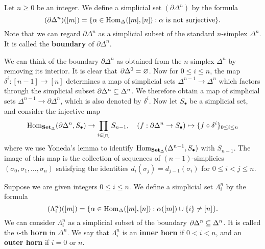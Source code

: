 Let $n\geq 0$ be an integer. We define a simplicial set $(\partial\Delta^n)$ by the formula
\[(\partial\Delta^n)([m])=\{\alpha\in\mathrm{Hom}_{\Delta}([m],[n]):\text{$\alpha$ is not surjective}\}.\]
Note that we can regard $\partial\Delta^n$ as a simplicial subset of the standard $n$-simplex $\Delta^n$. It is called the \textbf{boundary} of $\partial\Delta^n$. 
\begin{example}
We can think of the boundary $\partial\Delta^n$ as obtained from the $n$-simplex $\Delta^n$ by removing its interior. It is clear that $\partial\Delta^0=\varnothing$. Now for $0\leq i\leq n$, the map $\delta^i:[n-1]\to[n]$ determines a map of simplicial sets $\Delta^{n-1}\to\Delta^n$ which factors through the simplicial subset $\partial\Delta^n\subseteq\Delta^n$. We therefore obtain a map of simplicial sets $\Delta^{n-1}\to\partial\Delta^n$, which is also denoted by $\delta^i$. Now let $S_\bullet$ be a simplicial set, and consider the injective map
\[\mathrm{Hom}_{\mathbf{Set}_\Delta}(\partial\Delta^n,S_\bullet)\to\prod_{i\in[n]}S_{n-1},\quad (f:\partial\Delta^n\to S_\bullet)\mapsto\{f\circ\delta^i\}_{0\leq i\leq n}\]
where we use Yoneda's lemma to identify $\mathrm{Hom}_{\mathbf{Set}_\Delta}(\Delta^{n-1},S_\bullet)$ with $S_{n-1}$. The image of this map is the collection of sequences of $(n-1)$-simplicies $(\sigma_0,\sigma_1,\dots,\sigma_n)$ satisfying the identities $d_i(\sigma_j)=d_{j-1}(\sigma_i)$ for $0\leq i<j\leq n$.
\end{example}
Suppose we are given integers $0\leq i\leq n$. We define a simplicial set $\Lambda_i^n$ by the formula
\[(\Lambda_i^n)([m])=\{\alpha\in\mathrm{Hom}_{\Delta}([m],[n]):\alpha([m])\cup\{i\}\neq[n]\}.\]
We can consider $\Lambda_i^n$ as a simplicial subset of the boundary $\partial\Delta^n\subseteq\Delta^n$. It is called the $i$-th \textbf{horn} in $\Delta^n$. We say that $\Lambda_i^n$ is an \textbf{inner horn} if $0<i<n$, and an \textbf{outer horn} if $i=0$ or $n$.
